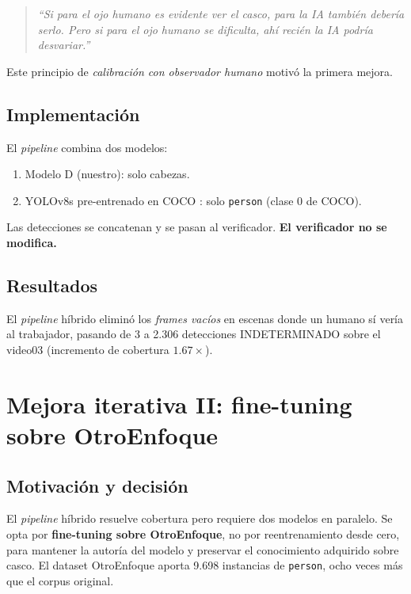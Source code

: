 \documentclass[conference]{IEEEtran}
\begin{document}
\begin{quotation}
\textit{``Si para el ojo humano es evidente ver el casco, para la
IA también debería serlo. Pero si para el ojo humano se dificulta,
ahí recién la IA podría desvariar.''}
\end{quotation}

Este principio de \emph{calibración con observador humano} motivó
la primera mejora.

\subsection{Implementación}

El \textit{pipeline} combina dos modelos:
\begin{enumerate}
    \item Modelo D (nuestro): solo cabezas.
    \item YOLOv8s pre-entrenado en COCO \cite{cocometrics}: solo
    \texttt{person} (clase 0 de COCO).
\end{enumerate}

Las detecciones se concatenan y se pasan al verificador. \textbf{El
verificador no se modifica.}

\subsection{Resultados}

El \emph{pipeline} híbrido eliminó los \emph{frames vacíos} en
escenas donde un humano sí vería al trabajador, pasando de 3 a
2.306 detecciones INDETERMINADO sobre el video03 (incremento de
cobertura $1.67\times$).

\section{Mejora iterativa II: fine-tuning sobre OtroEnfoque}
\label{sec:finetuning}

\subsection{Motivación y decisión}

El \textit{pipeline} híbrido resuelve cobertura pero requiere dos
modelos en paralelo. Se opta por \textbf{fine-tuning sobre
OtroEnfoque}, no por reentrenamiento desde cero, para mantener la
autoría del modelo y preservar el conocimiento adquirido sobre
casco. El dataset OtroEnfoque aporta 9.698 instancias de
\texttt{person}, ocho veces más que el corpus original.
\end{document}
